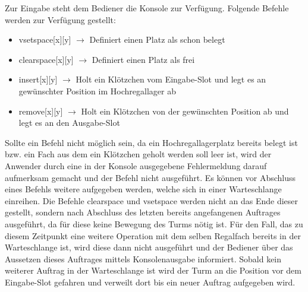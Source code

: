 Zur Eingabe steht dem Bediener die Konsole zur Verfügung.
\newline\newline
Folgende Befehle werden zur Verfügung gestellt:
\begin{itemize} 
	\item vsetspace[x][y] $\rightarrow$ Definiert einen Platz als schon belegt
	\item clearspace[x][y] $\rightarrow$ Definiert einen Platz als frei
	\item insert[x][y] $\rightarrow$ Holt ein Klötzchen vom Eingabe-Slot und legt es an gewünschter Position im Hochregallager ab
	\item remove[x][y] $\rightarrow$ Holt ein Klötzchen von der gewünschten Position ab und legt es an den Ausgabe-Slot
\end{itemize}

Sollte ein Befehl nicht möglich sein, da ein Hochregallagerplatz bereits belegt ist bzw. ein Fach aus dem ein Klötzchen geholt werden soll leer ist, wird der Anwender durch eine in der Konsole ausgegebene Fehlermeldung darauf aufmerksam gemacht und der Befehl nicht ausgeführt. Es können vor Abschluss eines Befehls weitere aufgegeben werden, welche sich in einer Warteschlange einreihen. Die Befehle \glqq{} clearspace \grqq{} und \glqq{}vsetspace\grqq{} werden nicht an das Ende dieser gestellt, sondern nach Abschluss des letzten bereits angefangenen Auftrages ausgeführt, da für diese keine Bewegung des Turms nötig ist. Für den Fall, das zu diesem Zeitpunkt eine weitere Operation mit dem selben Regalfach bereits in der Warteschlange ist, wird diese dann nicht ausgeführt und der Bediener über das Aussetzen dieses Auftrages mittels Konsolenausgabe informiert.
Sobald kein weiterer Auftrag in der Warteschlange ist wird der Turm an die Position vor dem Eingabe-Slot gefahren und verweilt dort bis ein neuer Auftrag aufgegeben wird.

